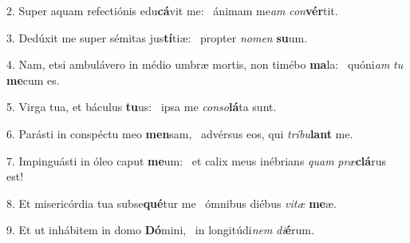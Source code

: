 2. Super aquam refectiónis edu\textbf{cá}vit me: \ast\  ánimam me\textit{am} \textit{con}\textbf{vér}tit.\

3. Dedúxit me super sémitas jus\textbf{tí}tiæ: \ast\  propter \textit{no}\textit{men} \textbf{su}um.\

4. Nam, etsi ambulávero in médio umbræ mortis, non timébo \textbf{ma}la: \ast\  quóni\textit{am} \textit{tu} \textbf{me}cum es.\

5. Virga tua, et báculus \textbf{tu}us: \ast\  ipsa me \textit{con}\textit{so}\textbf{lá}ta sunt.\

6. Parásti in conspéctu meo \textbf{men}sam, \ast\  advérsus eos, qui \textit{trí}\textit{bu}\textbf{lant} me.\

7. Impinguásti in óleo caput \textbf{me}um: \ast\  et calix meus inébrians \textit{quam} \textit{præ}\textbf{clá}rus est!\

8. Et misericórdia tua subse\textbf{qué}tur me \ast\  ómnibus diébus \textit{vi}\textit{tæ} \textbf{me}æ.\

9. Et ut inhábitem in domo \textbf{Dó}mini, \ast\  in longitúdi\textit{nem} \textit{di}\textbf{é}rum.\


